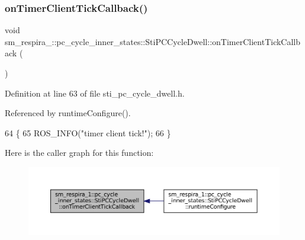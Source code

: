 \subsubsection{\texorpdfstring{on\+Timer\+Client\+Tick\+Callback()}{onTimerClientTickCallback()}}
{\footnotesize\ttfamily void sm\+\_\+respira\+\_\+::pc\+\_\+cycle\+\_\+inner\+\_\+states\+::\+Sti\+P\+C\+Cycle\+Dwell\+::on\+Timer\+Client\+Tick\+Callback (\begin{DoxyParamCaption}{ }\end{DoxyParamCaption})\hspace{0.3cm}{\ttfamily [inline]}}



Definition at line 63 of file sti\+\_\+pc\+\_\+cycle\+\_\+dwell.\+h.



Referenced by runtime\+Configure().


\begin{DoxyCode}
64   \{
65     ROS\_INFO(\textcolor{stringliteral}{"timer client tick!"});
66   \}
\end{DoxyCode}
Here is the caller graph for this function\+:
\nopagebreak
\begin{figure}[H]
\begin{center}
\leavevmode
\includegraphics[width=350pt]{structsm__respira__1_1_1pc__cycle__inner__states_1_1StiPCCycleDwell_aaa9be342bc58926f91230ab15e4925cc_icgraph}
\end{center}
\end{figure}
\mbox{\label{structsm__respira__1_1_1pc__cycle__inner__states_1_1StiPCCycleDwell_a2523862e7ca0fcc8886879dcaf4fd6d2}} 

